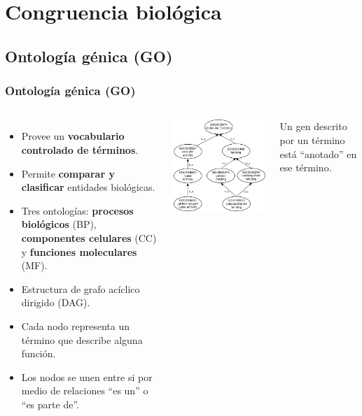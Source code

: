 \documentclass[serif,9pt, t]{beamer}
\newcommand\Fontvi{\fontsize{7}{7.2}\selectfont}
\begin{document}
\section{Congruencia biológica}

\subsection{Ontología génica (GO)}
\begin{frame}\frametitle{Ontología génica (GO)}
\begin{columns}[T]
	\begin{itemize}
		\item Provee un \textbf{vocabulario controlado de términos}.
		\item Permite \textbf{comparar y clasificar} entidades biológicas.
		\item Tres ontologías: \textbf{procesos biológicos} (BP), \textbf{componentes celulares} (CC) y \textbf{funciones moleculares} (MF).
		\item Estructura de grafo acíclico dirigido (DAG).
		\item Cada nodo representa un término que describe alguna función.
		\item Los nodos se unen entre si por medio de relaciones ``es un'' o ``es parte de''.
	\end{itemize}
	\centering
	\includegraphics[width=1\textwidth]{ejemplo_de_go.jpg}	
	
	\medskip
	\Fontvi
	Un gen descrito por un término está ``anotado'' en ese término.	
\end{columns}
\end{frame}
\end{document}
